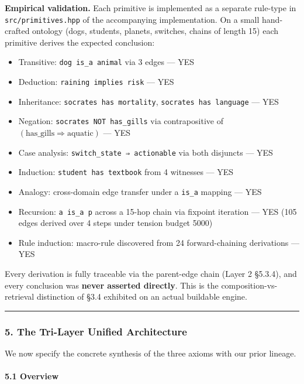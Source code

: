 \documentclass[
  11pt,
  a4paper,
]{article}
\providecommand{\tightlist}{%
  \setlength{\itemsep}{0pt}\setlength{\parskip}{0pt}}
\begin{document}
\textbf{Empirical validation.} Each primitive is implemented as a
separate rule-type in \texttt{src/primitives.hpp} of the accompanying
implementation. On a small hand-crafted ontology (dogs, students,
planets, switches, chains of length 15) each primitive derives the
expected conclusion:

\begin{itemize}
\tightlist
\item
  Transitive: \texttt{dog\ is\_a\ animal} via 3 edges --- YES
\item
  Deduction: \texttt{raining\ implies\ risk} --- YES
\item
  Inheritance: \texttt{socrates\ has\ mortality},
  \texttt{socrates\ has\ language} --- YES
\item
  Negation: \texttt{socrates\ NOT\ has\_gills} via contrapositive of
  \((\text{has\_gills} \Rightarrow \text{aquatic})\) --- YES
\item
  Case analysis: \texttt{switch\_state\ ⇒\ actionable} via both
  disjuncts --- YES
\item
  Induction: \texttt{student\ has\ textbook} from 4 witnesses --- YES
\item
  Analogy: cross-domain edge transfer under a \texttt{is\_a} mapping ---
  YES
\item
  Recursion: \texttt{a\ is\_a\ p} across a 15-hop chain via fixpoint
  iteration --- YES (105 edges derived over 4 steps under tension budget
  5000)
\item
  Rule induction: macro-rule discovered from 24 forward-chaining
  derivations --- YES
\end{itemize}

Every derivation is fully traceable via the parent-edge chain (Layer 2
§5.3.4), and every conclusion was \textbf{never asserted directly}. This
is the composition-vs-retrieval distinction of §3.4 exhibited on an
actual buildable engine.

\begin{center}\rule{0.5\linewidth}{0.5pt}\end{center}

\subsubsection{5. The Tri-Layer Unified
Architecture}\label{the-tri-layer-unified-architecture}

We now specify the concrete synthesis of the three axioms with our prior
lineage.

\paragraph{5.1 Overview}\label{overview}
\end{document}
